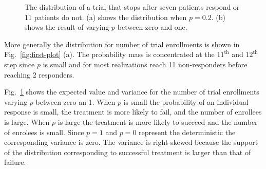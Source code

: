 \documentclass[review]{elsarticle}
\begin{document}
\begin{figure}[bp!]
\centering
{}
\hfill
{}
\caption{
The distribution of a trial that stops after seven patients respond
or 11 patients do not. (a) shows the distribution when
$p = 0.2$. (b) shows the result of varying $p$ between 
zero and one.
}
\label{fig:exp-and-var}
\end{figure}

More generally the distribution for number of trial enrollments is shown in 
Fig.~\ref{fig:first-plot} (a). The probability mass is concentrated at the 
$11^{\text{th}}$ and $12^{\text{th}}$ step since $p$ 
is small and for most realizations reach 11 
non-responders before reaching 2 responders.

Fig.~\ref{fig:exp-and-var} shows the expected value and variance for the
number of trial enrollments varying $p$ between zero an 1. When $p$ is
small the probability of an individual response is small, the treatment
is more likely to fail, and the number of enrollees is large. When $p$
is large the treatment is more likely to succeed and the number of 
enrolees is small. Since $p=1$ and $p=0$ represent the deterministic
the corresponding variance is zero. The variance is right-skewed because
the support of the distribution corresponding to successful treatment
is larger than that of failure.
\end{document}
